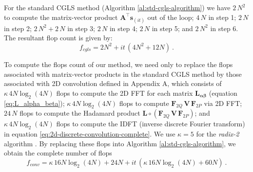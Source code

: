 \documentclass[manuscript]{geophysics}
\begin{document}

For the standard CGLS method (Algorithm \ref{al:std-cgls-algorithm}) we have $2 \, N^2$ to compute
the matrix-vector product $\mathbf{A}^{\top} \mathbf{s}_{(it)}$ out of the loop;
$4 \, N$ in step 1; $2 \, N$ in step 2; $2 \, N^2 + 2 \, N$ in step 3; $2 \, N$ in step 4;
$2 \, N$ in step 5; and $2 \, N^2$ in step 6. The resultant flop count is given by:
\begin{equation}
	f_{cgls} =  2 N^{2} + it \, (4 N^{2} + 12 N) \: .
	\label{eq:flops-standard-cgls}
\end{equation}


To compute the flops count of our method, we need only to replace the flops associated with 
matrix-vector products in the standard CGLS method by those associated with
2D convolution defined in Appendix A, which consists of $\kappa  \, 4 N \log_2(4N)$ flops to
compute the 2D FFT for each matrix $\mathbf{L}_{\boldsymbol{\alpha\beta}}$ (equation 
\ref{eq:L_alpha_beta}); $\kappa  \, 4 N \log_2(4N)$ flops to compute 
$\mathbf{F}_{2Q} \, \mathbf{V} \, \mathbf{F}_{2P}$ via 2D FFT; $24 \, N$ flops to compute the 
Hadamard product $\mathbf{L} \circ \left(\mathbf{F}_{2Q} \, \mathbf{V} \, \mathbf{F}_{2P} \right)$; 
and $\kappa  \, 4 N \log_2(4N)$ flops to compute the IDFT (inverse discrete Fourier transform) in equation 
\ref{eq:2d-discrete-convolution-complete}. We use $\kappa = 5$ for the \emph{radix-2} algorithm
\citep[][ p.~15]{vanloan1992}. By replacing these flops into Algorithm \ref{al:std-cgls-algorithm},
we obtain the complete number of flops
\begin{equation}
	f_{conv} =  \kappa  \, 16 N \log_2(4 N) + 24 N + it \, (\kappa  \, 16 N \log_2 (4 N) + 60 N) \: .
	\label{eq:flops-convolutional-method}
\end{equation}
\end{document}
